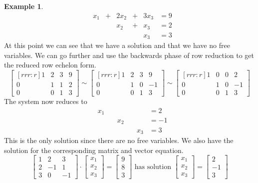 \documentclass[12pt,letterpaper]{article}
\newcommand{\x}{{\bf x}}
\newcommand{\0}{{\bf 0}}
\theoremstyle{plain}
\theoremstyle{definition}
\newtheorem{example}{Example}
\begin{document}
\begin{example}
\[\begin{array}{lrcrcrl}
&x_1& +&2x_2&+&3x_3&=9\\
 &\ &\  &x_2&+&x_3&=2\\
&\ &\ &\ & \ &x_3&=3
\end{array}
\]
At this point we can see that we have a solution and that we have no free variables. We can go further and use the backwards phase of row reduction to get the reduced row echelon form. 
\[\begin{bmatrix}[rrr:r]
1& 2 & 3 &9\\
0& 1& 1&2\\
0 & 0 & 1 &3
\end{bmatrix}\sim \begin{bmatrix}[rrr:r]
1& 2 & 3 &9\\
0& 1& 0&-1\\
0 & 0 & 1 &3
\end{bmatrix}
\sim \begin{bmatrix}[rrr:r]
1& 0 & 0 &2\\
0& 1& 0&-1\\
0 & 0 & 1 &3
\end{bmatrix}\]
The system now reduces to 
\[\begin{array}{lrcrcrl}
&x_1&\ &\ &\ &\ &=2\\
 &\ &\  &x_2&\ &\ &=-1\\
&\ &\ &\ & \ &x_3&=3
\end{array}
\]
This is the only solution since there are no free variables.
We also have the solution for the corresponding matrix and vector equation. 
\[
\begin{bmatrix}
1& 2 & 3 \\
2& -1 & 1\\
3 & 0 & -1
\end{bmatrix}\cdot\begin{bmatrix}x_1\\x_2\\x_3\end{bmatrix}=\begin{bmatrix}9\\8\\3\end{bmatrix}\text{ has solution }\begin{bmatrix}x_1\\x_2\\x_3\end{bmatrix}=\begin{bmatrix}2\\-1\\3\end{bmatrix}
\]


\end{example}
\end{document}
